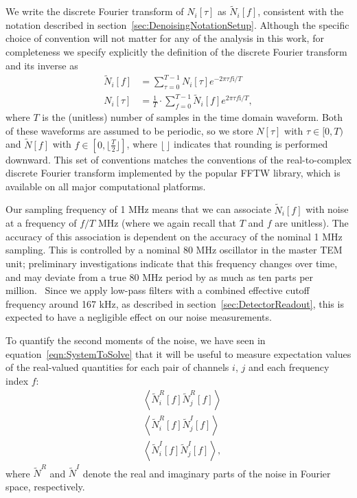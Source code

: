 We write the discrete Fourier transform of $N_i[\tau]$ as $\widetilde{N}_i[f]$, consistent with the notation described in section~\ref{sec:DenoisingNotationSetup}.  Although the specific choice of convention will not matter for any of the analysis in this work, for completeness we specify explicitly the definition of the discrete Fourier transform and its inverse as
\begin{align}
\widetilde{N}_i[f] &= \sum_{\tau = 0}^{T-1} N_i[\tau] e^{-2\pi \tau f \mathrm{i}/T}\label{eqn:NoiseChapterDefnFourierTransform}\\
N_i[\tau] &= \frac{1}{T}\cdot \sum_{f = 0}^{T-1} \widetilde{N}_i[f] e^{2\pi \tau f \mathrm{i}/T},
\end{align}
where $T$ is the (unitless) number of samples in the time domain waveform.  Both of these waveforms are assumed to be periodic, so we store $N[\tau]$ with $\tau \in [0, T)$ and $\widetilde{N}[f]$ with $f \in \left[0, \lfloor \frac{T}{2} \rfloor\right]$, where $\lfloor\,\rfloor$ indicates that rounding is performed downward.  This set of conventions matches the conventions of the real-to-complex discrete Fourier transform implemented by the popular FFTW library, which is available on all major computational platforms.~\cite{FFTW05}

Our sampling frequency of 1 MHz means that we can associate $\widetilde{N}_i[f]$ with noise at a frequency of $f/T$ MHz (where we again recall that $T$ and $f$ are unitless).  The accuracy of this association is dependent on the accuracy of the nominal 1 MHz sampling.  This is controlled by a nominal 80 MHz oscillator in the master TEM unit; preliminary investigations indicate that this frequency changes over time, and may deviate from a true 80 MHz period by as much as ten parts per million.~\cite{DAQWeirdDetails,EXOElectronicsFunctionalSpecification}  Since we apply low-pass filters with a combined effective cutoff frequency around 167 kHz, as described in section~\ref{sec:DetectorReadout}, this is expected to have a negligible effect on our noise measurements.

To quantify the second moments of the noise, we have seen in equation~\ref{eqn:SystemToSolve} that it will be useful to measure expectation values of the real-valued quantities for each pair of channels $i$, $j$ and each frequency index $f$:
\begin{subequations}\label{eq:NoiseChapterAllExpValues}\begin{align}
&\left<\widetilde{N}^R_i[f]\widetilde{N}^R_j[f]\right>\label{eq:NoiseChapterFirstExpValue}\\
&\left<\widetilde{N}^R_i[f]\widetilde{N}^I_j[f]\right>\label{eq:NoiseChapterSecondExpValue}\\
&\left<\widetilde{N}^I_i[f]\widetilde{N}^I_j[f]\right>\label{eq:NoiseChapterThirdExpValue},
\end{align}\end{subequations}
where $\widetilde{N}^R$ and $\widetilde{N}^I$ denote the real and imaginary parts of the noise in Fourier space, respectively.


